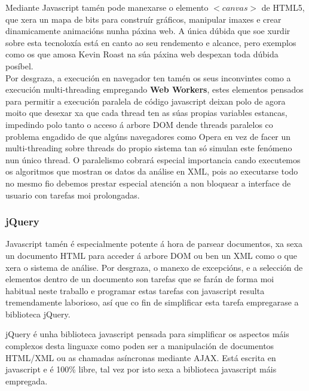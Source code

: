         Mediante Javascript tamén pode manexarse o elemento $<canvas>$ de HTML5, que xera un mapa
        de bits para construír gráficos, manipular imaxes e crear dinamicamente animacións nunha
        páxina web. A única dúbida que soe xurdir sobre esta tecnoloxía está en canto ao seu 
        rendemento e alcance, pero exemplos como os que amosa Kevin Roast na súa páxina 
        web\cite{kevin-roast-canvas-examples} despexan toda dúbida posíbel.\\
        
        Por desgraza, a execución en navegador ten tamén os seus inconvintes como a execución 
        multi-threading empregando \textbf{Web Workers}, estes elementos pensados para permitir
        a execución paralela de código javascript deixan polo de agora moito que desexar xa que 
        cada thread ten as súas propias variables estancas, impedindo polo tanto o acceso á 
        arbore DOM dende threads paralelos co problema engadido de que algúns navegadores como 
        Opera en vez de facer un multi-threading sobre threads do propio sistema  tan só simulan
        este fenómeno nun único thread. O paralelismo cobrará especial importancia 
        cando executemos os algoritmos que mostran os datos da análise en XML, pois ao 
        executarse todo no mesmo fio debemos prestar especial atención a non bloquear a 
        interface de usuario con tarefas moi prolongadas.\\
    
        \subsubsection{jQuery}
    
            Javascript tamén é especialmente potente á hora de parsear documentos, xa sexa
            un documento HTML para acceder á arbore DOM ou ben un XML como o que xera o sistema de 
            análise. Por desgraza, o manexo de excepcións, e a selección de elementos dentro de un 
            documento son tarefas que se farán de forma moi habitual neste traballo e programar 
            estas tarefas con javascript resulta tremendamente laborioso, así que co fin de 
            simplificar esta tarefa empregarase a biblioteca jQuery.
                
            jQuery é unha biblioteca javascript pensada para simplificar os aspectos máis complexos desta 
            linguaxe como poden ser a manipulación de documentos HTML/XML ou as chamadas asíncronas 
            mediante AJAX. Está escrita en javascript e é 100\% libre, tal vez por isto sexa a biblioteca
            javascript máis empregada.
            
